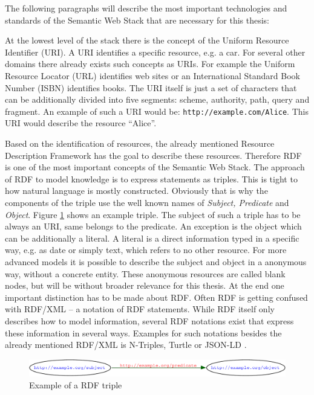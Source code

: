 The following paragraphs will describe the most important technologies and standards of the Semantic Web Stack that are necessary for this thesis:

At the lowest level of the stack there is the concept of the Uniform Resource Identifier (URI).
A URI identifies a specific resource, e.g. a car.
For several other domains there already exists such concepts as URIs.
For example the Uniform Resource Locator (URL) identifies web sites or an International Standard Book Number (ISBN) identifies books.
The URI itself is just a set of characters that can be additionally divided into five segments: scheme, authority, path, query and fragment.
An example of such a URI would be: \texttt{http://example.com/Alice}.
This URI would describe the resource ``Alice''.

Based on the identification of resources, the already mentioned Resource Description Framework has the goal to describe these resources.
Therefore RDF is one of the most important concepts of the Semantic Web Stack.
The approach of RDF to model knowledge is to express statements as triples.
This is tight to how natural language is mostly constructed.
Obviously that is why the components of the triple use the well known names of \textit{Subject, Predicate} and \textit{Object}.
Figure \ref{fig:sem_rdf} shows an example triple.
The subject of such a triple has to be always an URI, same belongs to the predicate.
An exception is the object which can be additionally a literal.
A literal is a direct information typed in a specific way, e.g. as date or simply text, which refers to no other resource.
For more advanced models it is possible to describe the subject and object in a anonymous way, without a concrete entity.
These anonymous resources are called blank nodes, but will be without broader relevance for this thesis.
At the end one important distinction has to be made about RDF.
Often RDF is getting confused with RDF/XML \cite{beckett2004rdf} -- a notation of RDF statements.
While RDF itself only describes how to model information, several RDF notations exist that express these information in several ways.
Examples for such notations besides the already mentioned RDF/XML is N-Triples, Turtle \cite{beckett2008turtle} or JSON-LD \cite{lanthaler2012using}.

\begin{figure}
  \centering
  \includegraphics[width=\textwidth]{preliminaries/semweb_rdf1}
  \caption{Example of a RDF triple}
  \label{fig:sem_rdf}
\end{figure}

